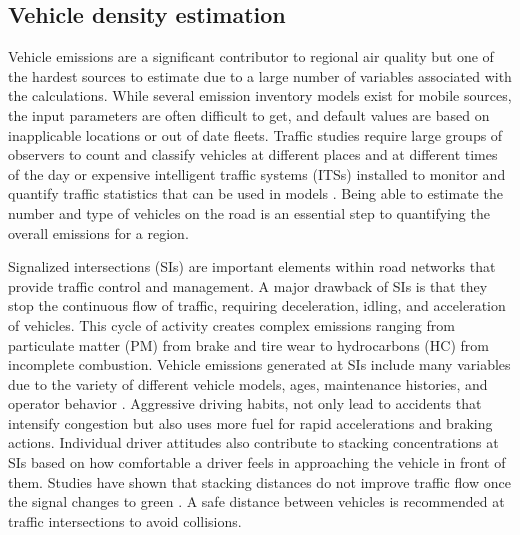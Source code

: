 \clearpage
\subsection{Vehicle density estimation}

Vehicle emissions are a significant contributor to regional air quality but one of the hardest sources to estimate due to a large number of variables associated with the calculations. While several emission inventory models exist for mobile sources, the input parameters are often difficult to get, and default values are based on inapplicable locations or out of date fleets. Traffic studies require large groups of observers to count and classify vehicles at different places and at different times of the day or expensive intelligent traffic systems (ITSs) installed to monitor and quantify traffic statistics that can be used in models \citep{Suzuki2015}. Being able to estimate the number and type of vehicles on the road is an essential step to quantifying the overall emissions for a region. 

Signalized intersections (SIs) are important elements within road networks that provide traffic control and management. A major drawback of SIs is that they stop the continuous flow of traffic, requiring deceleration, idling, and acceleration of vehicles. This cycle of activity creates complex emissions ranging from particulate matter (PM) from brake and tire wear to hydrocarbons (HC) from incomplete combustion. Vehicle emissions generated at SIs include many variables due to the variety of different vehicle models, ages, maintenance histories, and operator behavior \citep{Freeman2015a, Li2009}. Aggressive driving habits, not only lead to accidents that intensify congestion but also uses more fuel for rapid accelerations and braking actions. Individual driver attitudes also contribute to stacking concentrations at SIs based on how comfortable a driver feels in approaching the vehicle in front of them. Studies have shown that stacking distances do not improve traffic flow once the signal changes to green  \citep{Ahmadi2017}. A safe distance between vehicles is recommended at traffic intersections to avoid collisions.

